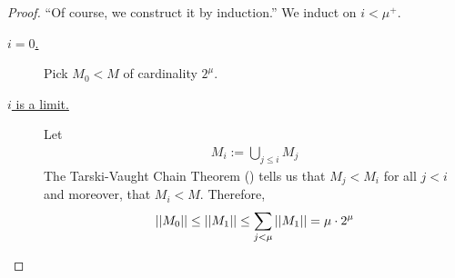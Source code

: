 \begin{proof}
    ``Of course, we construct it by induction.'' We induct on $i < \mu^+$.

    \begin{description}
        \item[\underline{$i = 0$.}] Pick $M_0 < M$ of cardinality $2^{\mu}$.

        \item[\underline{$i$ is a limit.}] Let
        \begin{align*}
            M_i := \bigcup_{j \leq i} M_j
        \end{align*}
        The Tarski-Vaught Chain Theorem (\sorry) tells us that $M_j < M_i$ for all $j < i$ and moreover, that $M_i < M$. Therefore,
        \begin{align*}
            \left\lvert \left\lvert M_0 \right\rvert \right\rvert \leq \left\lvert \left\lvert M_1 \right\rvert \right\rvert \leq \sum_{j < \mu} \left\lvert \left\lvert M_1 \right\rvert \right\rvert = \mu \cdot 2^{\mu}
        \end{align*}


\end{description}
\end{proof}
